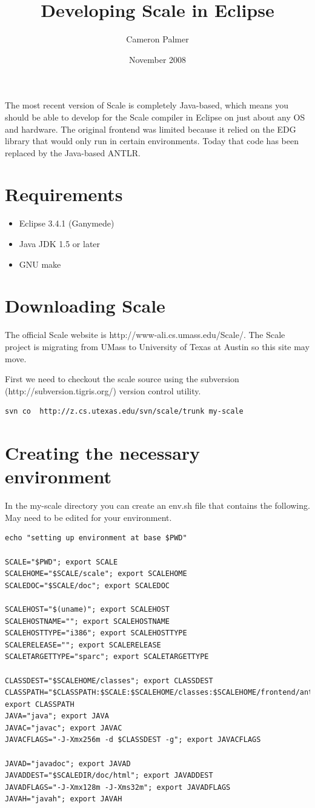 \documentclass[12pt,twoside,letterpaper]{article}
\title{Developing Scale in Eclipse}
\author{Cameron Palmer}
\date{November 2008}
\begin{document}
\maketitle
The most recent version of Scale is completely Java-based, which means you should be able to develop for the Scale compiler in Eclipse on just about any OS and hardware. The original frontend was limited because it relied on the EDG library that would only run in certain environments. Today that code has been replaced by the Java-based ANTLR.

\section*{Requirements}
\begin{itemize}
\item Eclipse 3.4.1 (Ganymede)
\item Java JDK 1.5 or later
\item GNU make
\end{itemize}

\section*{Downloading Scale}
The official Scale website is http://www-ali.cs.umass.edu/Scale/. The Scale project is migrating from UMass to University of Texas at Austin so this site may move.

First we need to checkout the scale source using the subversion (http://subversion.tigris.org/) version control utility.
\begin{verbatim}
svn co  http://z.cs.utexas.edu/svn/scale/trunk my-scale
\end{verbatim}

\section*{Creating the necessary environment}
In the my-scale directory you can create an env.sh file that contains the following. May need to be edited for your environment.

\begin{verbatim}
echo "setting up environment at base $PWD"

SCALE="$PWD"; export SCALE
SCALEHOME="$SCALE/scale"; export SCALEHOME
SCALEDOC="$SCALE/doc"; export SCALEDOC

SCALEHOST="$(uname)"; export SCALEHOST
SCALEHOSTNAME=""; export SCALEHOSTNAME
SCALEHOSTTYPE="i386"; export SCALEHOSTTYPE
SCALERELEASE=""; export SCALERELEASE
SCALETARGETTYPE="sparc"; export SCALETARGETTYPE

CLASSDEST="$SCALEHOME/classes"; export CLASSDEST
CLASSPATH="$CLASSPATH:$SCALE:$SCALEHOME/classes:$SCALEHOME/frontend/antlr.jar"
export CLASSPATH
JAVA="java"; export JAVA
JAVAC="javac"; export JAVAC
JAVACFLAGS="-J-Xmx256m -d $CLASSDEST -g"; export JAVACFLAGS

JAVAD="javadoc"; export JAVAD
JAVADDEST="$SCALEDIR/doc/html"; export JAVADDEST
JAVADFLAGS="-J-Xmx128m -J-Xms32m"; export JAVADFLAGS
JAVAH="javah"; export JAVAH
\end{verbatim}
\end{document}
